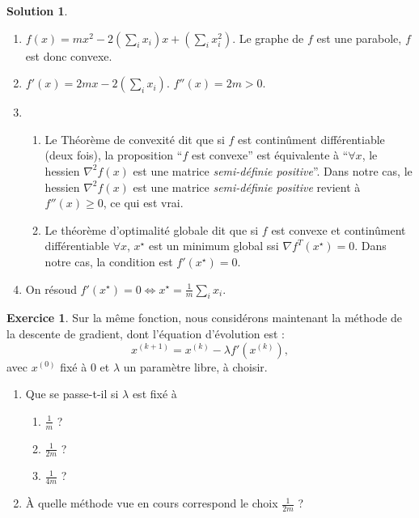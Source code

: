 \documentclass[a4paper,francais]{article}
\theoremstyle{definition}
\newtheorem{exercice}{Exercice}[section]
\newtheorem*{solution}{Solution}
\begin{document}
\begin{solution}
  \begin{enumerate}
  \item $f(x) = m x^2 - 2(\sum_ix_i)x + (\sum_ix_i^2)$.
    Le graphe de $f$ est une parabole, $f$ est donc convexe.  
  \item $f'(x) = 2m x - 2(\sum_ix_i)$. $f''(x) = 2m > 0$. 
  \item
    \begin{enumerate}
    \item Le Théorème de convexité dit que si $f$ est continûment différentiable (deux fois), 
      la proposition ``$f$ est convexe'' est équivalente à ``$\forall x$, le hessien $\nabla^2f(x)$
      est une matrice \emph{semi-définie positive}''. Dans notre cas, le hessien $\nabla^2f(x)$
      est une matrice \emph{semi-définie positive} revient à $f''(x) \geq 0$, ce qui est vrai.
    \item Le théorème d'optimalité globale dit que si $f$ est convexe et continûment différentiable
      $\forall x$, $x^\star$ est un minimum global ssi ${\nabla f}^T(x^\star) = 0$.
      Dans notre cas, la condition est $f'(x^\star) = 0$. 
    \end{enumerate}
  \item On résoud $f'(x^\star) = 0 \Leftrightarrow x^\star = \frac{1}{m}\sum_ix_i$.
  \end{enumerate}  
\end{solution}

\begin{exercice}  
  Sur la même fonction, nous considérons maintenant la méthode de la descente de gradient,
  dont l'équation d'évolution est :
  \[ x^{(k+1)} = x^{(k)} - \lambda f'(x^{(k)}), \]
  avec $x^{(0)}$ fixé à $0$ et $\lambda$ un paramètre libre, à choisir. 
  \begin{enumerate}
  \item Que se passe-t-il si $\lambda$ est fixé à
    \begin{enumerate}
    \item $\frac{1}{m}$ ?
    \item $\frac{1}{2m}$ ?
    \item $\frac{1}{4m}$ ?
    \end{enumerate}
  \item \`A quelle méthode vue en cours correspond le choix $\frac{1}{2m}$ ?
  \end{enumerate}
\end{exercice}
\end{document}
